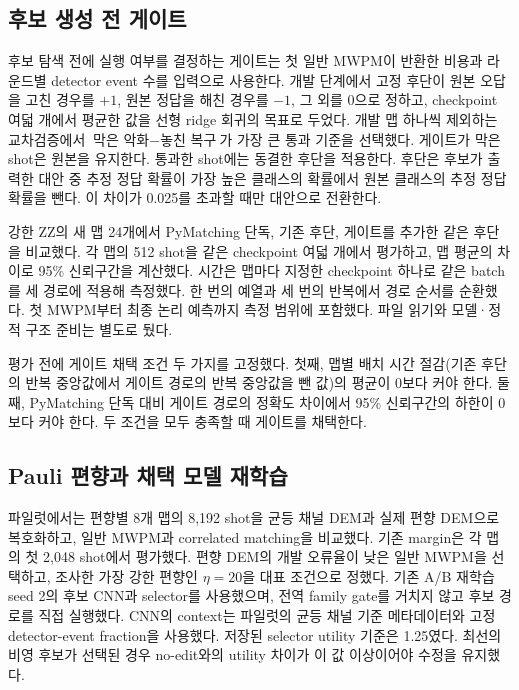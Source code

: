 \documentclass[aps,prd,12pt,twocolumn,superscriptaddress,floatfix]{revtex4-2}
\begin{document}
\subsection{후보 생성 전 게이트}

후보 탐색 전에 실행 여부를 결정하는 게이트는 첫 일반 MWPM이 반환한 비용과 라운드별 detector event 수를 입력으로 사용한다. 개발 단계에서 고정 후단이 원본 오답을 고친 경우를 \(+1\), 원본 정답을 해친 경우를 \(-1\), 그 외를 0으로 정하고, checkpoint 여덟 개에서 평균한 값을 선형 ridge 회귀의 목표로 두었다. 개발 맵 하나씩 제외하는 교차검증에서 \(\text{막은 악화}-\text{놓친 복구}\)가 가장 큰 통과 기준을 선택했다. 게이트가 막은 shot은 원본을 유지한다. 통과한 shot에는 동결한 후단을 적용한다. 후단은 후보가 출력한 대안 중 추정 정답 확률이 가장 높은 클래스의 확률에서 원본 클래스의 추정 정답 확률을 뺀다. 이 차이가 0.025를 초과할 때만 대안으로 전환한다.

강한 ZZ의 새 맵 24개에서 PyMatching 단독, 기존 후단, 게이트를 추가한 같은 후단을 비교했다. 각 맵의 512 shot을 같은 checkpoint 여덟 개에서 평가하고, 맵 평균의 차이로 95\% 신뢰구간을 계산했다. 시간은 맵마다 지정한 checkpoint 하나로 같은 batch를 세 경로에 적용해 측정했다. 한 번의 예열과 세 번의 반복에서 경로 순서를 순환했다. 첫 MWPM부터 최종 논리 예측까지 측정 범위에 포함했다. 파일 읽기와 모델·정적 구조 준비는 별도로 뒀다.

평가 전에 게이트 채택 조건 두 가지를 고정했다. 첫째, 맵별 배치 시간 절감(기존 후단의 반복 중앙값에서 게이트 경로의 반복 중앙값을 뺀 값)의 평균이 0보다 커야 한다. 둘째, PyMatching 단독 대비 게이트 경로의 정확도 차이에서 95\% 신뢰구간의 하한이 0보다 커야 한다. 두 조건을 모두 충족할 때 게이트를 채택한다.

\subsection{Pauli 편향과 채택 모델 재학습}

파일럿에서는 편향별 8개 맵의 8,192 shot을 균등 채널 DEM과 실제 편향 DEM으로 복호화하고, 일반 MWPM과 correlated matching을 비교했다. 기존 margin은 각 맵의 첫 2,048 shot에서 평가했다. 편향 DEM의 개발 오류율이 낮은 일반 MWPM을 선택하고, 조사한 가장 강한 편향인 \(\eta=20\)을 대표 조건으로 정했다. 기존 A/B 재학습 seed 2의 후보 CNN과 selector를 사용했으며, 전역 family gate를 거치지 않고 후보 경로를 직접 실행했다. CNN의 context는 파일럿의 균등 채널 기준 메타데이터와 고정 detector-event fraction을 사용했다. 저장된 selector utility 기준은 1.25였다. 최선의 비영 후보가 선택된 경우 no-edit와의 utility 차이가 이 값 이상이어야 수정을 유지했다.
\end{document}
